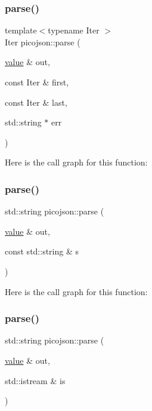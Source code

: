\hypertarget{namespacepicojson_a21621c03c9c8c83dcf5bc604d1cafdf6}{}\label{namespacepicojson_a21621c03c9c8c83dcf5bc604d1cafdf6} 
\subsubsection{\texorpdfstring{parse()}{parse()}\hspace{0.1cm}{\footnotesize\ttfamily [2/4]}}
{\footnotesize\ttfamily template$<$typename Iter $>$ \\
Iter picojson\+::parse (\begin{DoxyParamCaption}\item[{\hyperlink{classpicojson_1_1value}{value} \&}]{out,  }\item[{const Iter \&}]{first,  }\item[{const Iter \&}]{last,  }\item[{std\+::string $\ast$}]{err }\end{DoxyParamCaption})\hspace{0.3cm}{\ttfamily [inline]}}

Here is the call graph for this function\+:
\hypertarget{namespacepicojson_a522ebeba3ce386f1df0aba41ae3b7763}{}\label{namespacepicojson_a522ebeba3ce386f1df0aba41ae3b7763} 
\subsubsection{\texorpdfstring{parse()}{parse()}\hspace{0.1cm}{\footnotesize\ttfamily [3/4]}}
{\footnotesize\ttfamily std\+::string picojson\+::parse (\begin{DoxyParamCaption}\item[{\hyperlink{classpicojson_1_1value}{value} \&}]{out,  }\item[{const std\+::string \&}]{s }\end{DoxyParamCaption})\hspace{0.3cm}{\ttfamily [inline]}}

Here is the call graph for this function\+:
\hypertarget{namespacepicojson_a2ed8a3cba445c8ecbe3d6a3a3fbdabd3}{}\label{namespacepicojson_a2ed8a3cba445c8ecbe3d6a3a3fbdabd3} 
\subsubsection{\texorpdfstring{parse()}{parse()}\hspace{0.1cm}{\footnotesize\ttfamily [4/4]}}
{\footnotesize\ttfamily std\+::string picojson\+::parse (\begin{DoxyParamCaption}\item[{\hyperlink{classpicojson_1_1value}{value} \&}]{out,  }\item[{std\+::istream \&}]{is }\end{DoxyParamCaption})\hspace{0.3cm}{\ttfamily [inline]}}

